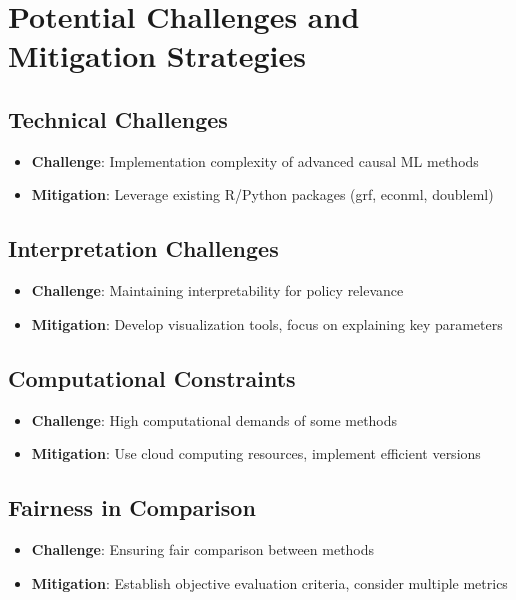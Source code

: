 \documentclass[12pt,a4paper]{article}
\begin{document}
\section{Potential Challenges and Mitigation Strategies}

\subsection{Technical Challenges}
\begin{itemize}
    \item \textbf{Challenge}: Implementation complexity of advanced causal ML methods
    \item \textbf{Mitigation}: Leverage existing R/Python packages (grf, econml, doubleml)
\end{itemize}

\subsection{Interpretation Challenges}
\begin{itemize}
    \item \textbf{Challenge}: Maintaining interpretability for policy relevance
    \item \textbf{Mitigation}: Develop visualization tools, focus on explaining key parameters
\end{itemize}

\subsection{Computational Constraints}
\begin{itemize}
    \item \textbf{Challenge}: High computational demands of some methods
    \item \textbf{Mitigation}: Use cloud computing resources, implement efficient versions
\end{itemize}

\subsection{Fairness in Comparison}
\begin{itemize}
    \item \textbf{Challenge}: Ensuring fair comparison between methods
    \item \textbf{Mitigation}: Establish objective evaluation criteria, consider multiple metrics
\end{itemize}




\appendix
\end{document}
